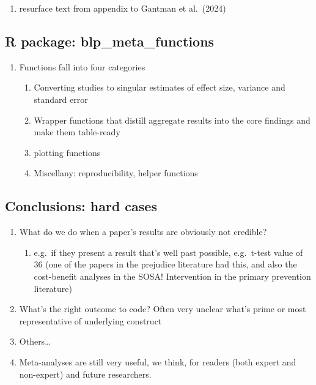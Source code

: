 \documentclass[
  man]{apa6}
\providecommand{\tightlist}{%
  \setlength{\itemsep}{0pt}\setlength{\parskip}{0pt}}
\begin{document}
\begin{enumerate}
\begin{enumerate}
    \begin{enumerate}
    \def\labelenumiii{\arabic{enumiii}.}
    \setcounter{enumiii}{6}
    \tightlist
    \item
      resurface text from appendix to Gantman et al.~(2024)
    \end{enumerate}
  \end{enumerate}
\end{enumerate}

\subsection{R package: blp\_meta\_functions}\label{r-package-blp_meta_functions}

\begin{enumerate}
\def\labelenumi{\arabic{enumi}.}
\tightlist
\item
  Functions fall into four categories

  \begin{enumerate}
  \def\labelenumii{\arabic{enumii}.}
  \tightlist
  \item
    Converting studies to singular estimates of effect size, variance and standard error
  \item
    Wrapper functions that distill aggregate results into the core findings and make them table-ready
  \item
    plotting functions
  \item
    Miscellany: reproducibility, helper functions
  \end{enumerate}
\end{enumerate}

\subsection{Conclusions: hard cases}\label{conclusions-hard-cases}

\begin{enumerate}
\def\labelenumi{\arabic{enumi}.}
\tightlist
\item
  What do we do when a paper's results are obviously not credible?

  \begin{enumerate}
  \def\labelenumii{\arabic{enumii}.}
  \tightlist
  \item
    e.g.~if they present a result that's well past possible, e.g.~t-test value of 36 (one of the papers in the prejudice literature had this, and also the cost-benefit analyses in the SOSA! Intervention in the primary prevention literature)
  \end{enumerate}
\item
  What's the right outcome to code? Often very unclear what's prime or most representative of underlying construct
\item
  Others\ldots{}
\item
  Meta-analyses are still very useful, we think, for readers (both expert and non-expert) and future researchers.
\end{enumerate}
\end{document}

